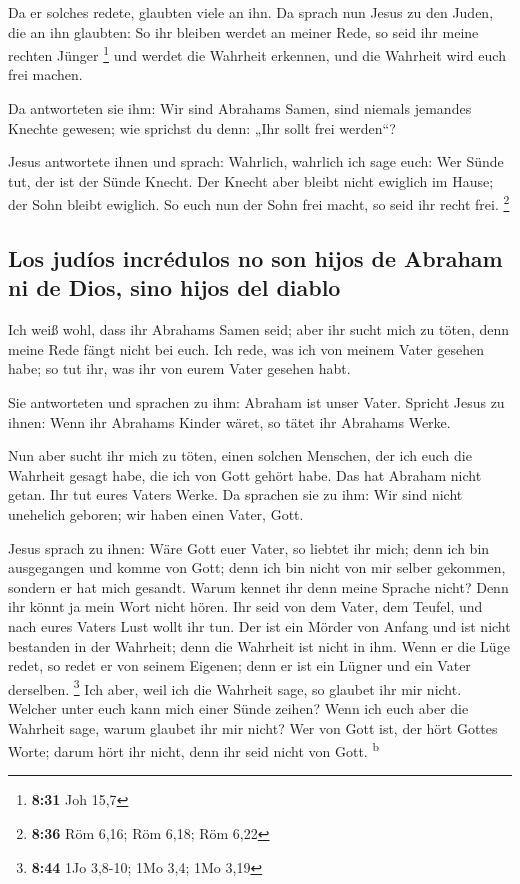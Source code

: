  Da er solches redete, glaubten viele an ihn.
 Da sprach nun Jesus zu den Juden, die an ihn glaubten:
So ihr bleiben werdet an meiner Rede, so seid ihr meine rechten Jünger
\footnote{\textbf{8:31} Joh 15,7}  und werdet die
Wahrheit erkennen, und die Wahrheit wird euch frei machen.

 Da antworteten sie ihm: Wir sind Abrahams Samen, sind
niemals jemandes Knechte gewesen; wie sprichst du denn: „Ihr sollt frei
werden``?

 Jesus antwortete ihnen und sprach: Wahrlich, wahrlich
ich sage euch: Wer Sünde tut, der ist der Sünde Knecht. 
Der Knecht aber bleibt nicht ewiglich im Hause; der Sohn bleibt
ewiglich.  So euch nun der Sohn frei macht, so seid ihr
recht frei. \footnote{\textbf{8:36} Röm 6,16; Röm 6,18; Röm 6,22}

\hypertarget{los-juduxedos-incruxe9dulos-no-son-hijos-de-abraham-ni-de-dios-sino-hijos-del-diablo}{%
\subsection{Los judíos incrédulos no son hijos de Abraham ni de Dios,
sino hijos del
diablo}\label{los-juduxedos-incruxe9dulos-no-son-hijos-de-abraham-ni-de-dios-sino-hijos-del-diablo}}

 Ich weiß wohl, dass ihr Abrahams Samen seid; aber ihr
sucht mich zu töten, denn meine Rede fängt nicht bei euch.
 Ich rede, was ich von meinem Vater gesehen habe; so tut
ihr, was ihr von eurem Vater gesehen habt.

 Sie antworteten und sprachen zu ihm: Abraham ist unser
Vater. Spricht Jesus zu ihnen: Wenn ihr Abrahams Kinder wäret, so tätet
ihr Abrahams Werke.

 Nun aber sucht ihr mich zu töten, einen solchen
Menschen, der ich euch die Wahrheit gesagt habe, die ich von Gott gehört
habe. Das hat Abraham nicht getan.  Ihr tut eures Vaters
Werke. Da sprachen sie zu ihm: Wir sind nicht unehelich geboren; wir
haben einen Vater, Gott.

 Jesus sprach zu ihnen: Wäre Gott euer Vater, so liebtet
ihr mich; denn ich bin ausgegangen und komme von Gott; denn ich bin
nicht von mir selber gekommen, sondern er hat mich gesandt.
 Warum kennet ihr denn meine Sprache nicht? Denn ihr
könnt ja mein Wort nicht hören.  Ihr seid von dem Vater,
dem Teufel, und nach eures Vaters Lust wollt ihr tun. Der ist ein Mörder
von Anfang und ist nicht bestanden in der Wahrheit; denn die Wahrheit
ist nicht in ihm. Wenn er die Lüge redet, so redet er von seinem
Eigenen; denn er ist ein Lügner und ein Vater derselben. \footnote{\textbf{8:44}
  1Jo 3,8-10; 1Mo 3,4; 1Mo 3,19}  Ich aber, weil ich die
Wahrheit sage, so glaubet ihr mir nicht.  Welcher unter
euch kann mich einer Sünde zeihen? Wenn ich euch aber die Wahrheit sage,
warum glaubet ihr mir nicht?  Wer von Gott ist, der hört
Gottes Worte; darum hört ihr nicht, denn ihr seid nicht von Gott.
\textsuperscript{b}

